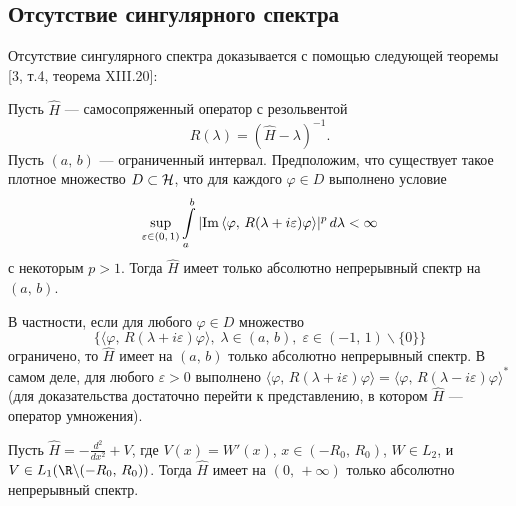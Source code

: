 \documentclass[a4paper
]{article}
\begin{document}
\subsection{Отсутствие сингулярного спектра}
\label{par_ots_sing_sp}
Отсутствие сингулярного спектра доказывается с помощью следующей
теоремы [3, т.4, теорема XIII.20]:
\begin{Trm}
Пусть $\hat H$ --- самосопряженный оператор с резольвентой $$R(\lambda)
=(\hat H-\lambda)^{-1}.$$ Пусть $(a, \, b)$ --- ограниченный интервал.
Предположим, что существует такое плотное множество $D\subset {\cal H}$,
что для каждого $\varphi\in D$ выполнено условие
\begin{align}
\sup _{\varepsilon \in (0, \, 1)}\int \limits_a^b |{\rm Im}\, \langle \varphi,
\, R(\lambda+i\varepsilon)\varphi\rangle|^p\, d\lambda<\infty
\end{align}
с некоторым $p>1$. Тогда $\hat H$ имеет только абсолютно непрерывный
спектр на $(a, \, b)$.
\end{Trm}
В частности, если для любого $\varphi\in D$ множество $$\{\langle \varphi, \,
R(\lambda+i\varepsilon)\varphi\rangle, \; \lambda\in (a, \, b), \;
\varepsilon \in (-1, \, 1)\backslash \{0\}\}$$ ограничено, то $\hat H$
имеет на $(a, \, b)$ только абсолютно непрерывный спектр. В самом деле,
для любого $\varepsilon >0$ выполнено $\langle \varphi , \, R(\lambda +
i\varepsilon)\varphi \rangle =\langle \varphi , \, R(\lambda -
i\varepsilon)\varphi \rangle ^*$ (для доказательства достаточно перейти к
представлению, в котором $\hat H$ --- оператор умножения).
\begin{Sta}
Пусть $\hat H=-\frac{d^2}{dx^2}+V$, где $V(x)=W'(x)$, $x\in (-R_0, \, R_0)$,
$W\in L_2$, и $V\in L_1(\R\backslash (-R_0, \, R_0))$. Тогда
$\hat H$ имеет на $(0, \, +\infty)$ только абсолютно непрерывный спектр.
\end{Sta}
\end{document}
